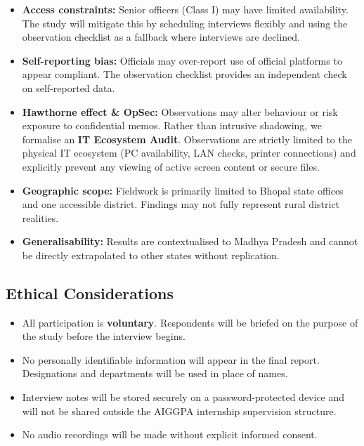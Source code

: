 \documentclass[11pt,a4paper]{article}
\begin{document}
\begin{itemize}
  \item \textbf{Access constraints:} Senior officers (Class I) may have limited
    availability. The study will mitigate this by scheduling interviews flexibly
    and using the observation checklist as a fallback where interviews are declined.
  \item \textbf{Self-reporting bias:} Officials may over-report use of official
    platforms to appear compliant. The observation checklist provides an independent
    check on self-reported data.
  \item \textbf{Hawthorne effect \& OpSec:} Observations may alter behaviour or risk exposure 
    to confidential memos. Rather than intrusive shadowing, we formalise an \textbf{IT Ecosystem Audit}. 
    Observations are strictly limited to the physical IT ecosystem (PC availability, LAN checks, 
    printer connections) and explicitly prevent any viewing of active screen content or secure files.
  \item \textbf{Geographic scope:} Fieldwork is primarily limited to Bhopal state
    offices and one accessible district. Findings may not fully represent rural
    district realities.
  \item \textbf{Generalisability:} Results are contextualised to Madhya Pradesh and
    cannot be directly extrapolated to other states without replication.
\end{itemize}

\subsection{Ethical Considerations}

\begin{itemize}
  \item All participation is \textbf{voluntary}. Respondents will be briefed on the
    purpose of the study before the interview begins.
  \item No personally identifiable information will appear in the final report.
    Designations and departments will be used in place of names.
  \item Interview notes will be stored securely on a password-protected device and
    will not be shared outside the AIGGPA internship supervision structure.
  \item No audio recordings will be made without explicit informed consent.
\end{itemize}
\end{document}

